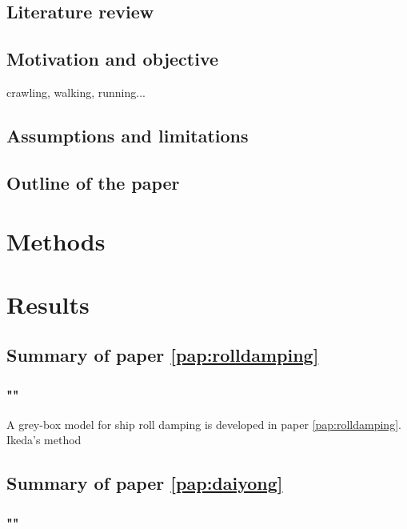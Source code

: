 \section{Literature review}


\section{Motivation and objective}

crawling, walking, running...

\section{Assumptions and limitations}

\section{Outline of the paper}


\chapter{Methods\label{ch:methods}}

\chapter{Results\label{ch:results}}

\section{Summary of paper \ref{pap:rolldamping}}
\subsection*{""}
A grey-box model for ship roll damping is developed in paper \ref{pap:rolldamping}.
Ikeda's method 

\section{Summary of paper \ref{pap:daiyong}}
\subsection*{""}

